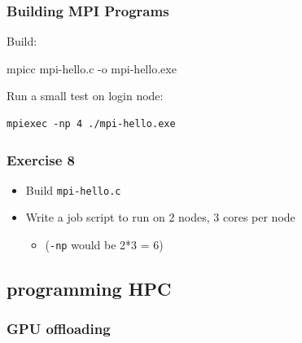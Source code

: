 \documentclass[
  letterpaper,
  DIV=11,
  numbers=noendperiod]{scrartcl}
\newenvironment{Shaded}{\begin{snugshade}}{\end{snugshade}}
\newcommand{\AttributeTok}[1]{\textcolor[rgb]{0.40,0.45,0.13}{#1}}
\newcommand{\ExtensionTok}[1]{\textcolor[rgb]{0.00,0.23,0.31}{#1}}
\newcommand{\NormalTok}[1]{\textcolor[rgb]{0.00,0.23,0.31}{#1}}
\providecommand{\tightlist}{%
  \setlength{\itemsep}{0pt}\setlength{\parskip}{0pt}}
\begin{document}
\subsubsection{Building MPI Programs}\label{building-mpi-programs}

Build:

\begin{Shaded}
\begin{Highlighting}[]
\ExtensionTok{mpicc}\NormalTok{ mpi{-}hello.c }\AttributeTok{{-}o}\NormalTok{ mpi{-}hello.exe}
\end{Highlighting}
\end{Shaded}

Run a small test on login node:

\begin{verbatim}
mpiexec -np 4 ./mpi-hello.exe
\end{verbatim}

\subsubsection{Exercise 8}\label{exercise-8}

\begin{itemize}
\tightlist
\item
  Build \texttt{mpi-hello.c}
\item
  Write a job script to run on 2 nodes, 3 cores per node

  \begin{itemize}
  \tightlist
  \item
    (\texttt{-np} would be 2*3 = 6)
  \end{itemize}
\end{itemize}

\subsection{programming HPC}\label{programming-hpc-2}

\subsubsection{GPU offloading}\label{gpu-offloading}
\end{document}
